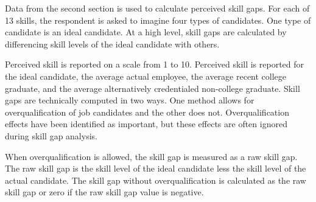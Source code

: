 \documentclass[review]{elsarticle}
\begin{document}

Data from the second section is used to calculate perceived skill gaps.
For each of 13 skills, the respondent is asked to imagine four types of candidates.
One type of candidate is an ideal candidate.
At a high level, skill gaps are calculated by differencing skill levels of the ideal candidate with others.

Perceived skill is reported on a scale from 1 to 10.
Perceived skill is reported for the ideal candidate,
the average actual employee,
the average recent college graduate,
and the average alternatively credentialed non-college graduate.
Skill gaps are technically computed in two ways.
One method allows for overqualification of job candidates and the other does not.
Overqualification effects have been identified as important\cite{green2007there, raybould2005over}, but these effects are often ignored during skill gap analysis\cite{blake_2018}.

When overqualification is allowed, the skill gap is measured as a raw skill gap.
The raw skill gap is the skill level of the ideal candidate less the skill level of the actual candidate.
The skill gap without overqualification is calculated as the raw skill gap or zero if the raw skill gap value is negative.

\end{document}
